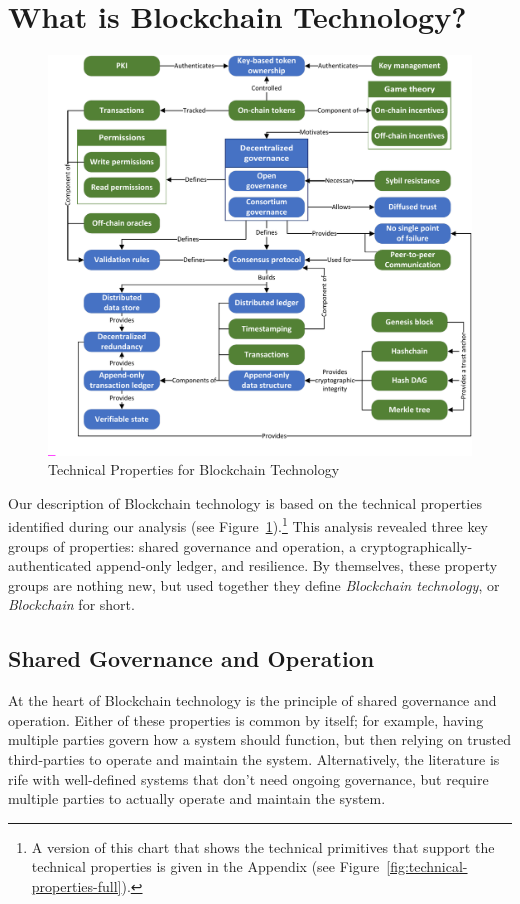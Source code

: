 
\section{What is Blockchain Technology?}
\begin{figure}
	\centering
	\includegraphics[page=2,width=\columnwidth]{figures/grounded-theory-main}
	
	\caption{Technical Properties for Blockchain Technology}
	\label{fig:technical-properties}
\end{figure}

\label{sec:blockchain}
Our description of Blockchain technology is based on the technical properties identified during our analysis (see Figure~\ref{fig:technical-properties}).\footnote{A version of this chart that shows the technical primitives that support the technical properties is given in the Appendix (see Figure~\ref{fig:technical-properties-full}).}
This analysis revealed three key groups of properties: shared governance and operation, a cryptographically-authenticated append-only ledger, and resilience.
By themselves, these property groups are nothing new, but used together they define \emph{Blockchain technology}, or \emph{Blockchain} for short.

\subsection{Shared Governance and Operation}
At the heart of Blockchain technology is the principle of shared governance and operation.
Either of these properties is common by itself; for example, having multiple parties govern how a system should function, but then relying on trusted third-parties to operate and maintain the system.
Alternatively, the literature is rife with well-defined systems that don't need ongoing governance, but require multiple parties to actually operate and maintain the system.

